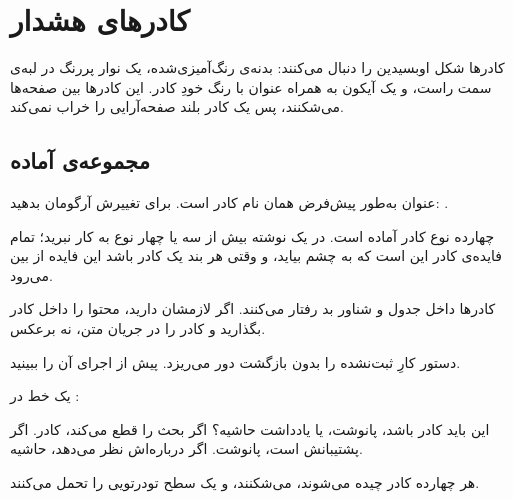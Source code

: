 \chapter{کادرهای هشدار}

کادرها شکل اوبسیدین را دنبال می‌کنند: بدنه‌ی رنگ‌آمیزی‌شده، یک نوار پررنگ در
لبه‌ی سمت راست، و یک آیکون به همراه عنوان با رنگ خودِ کادر. این کادرها بین
صفحه‌ها می‌شکنند، پس یک کادر بلند صفحه‌آرایی را خراب نمی‌کند.

\section{مجموعه‌ی آماده}

\begin{note}
عنوان به‌طور پیش‌فرض همان نام کادر است. برای تغییرش آرگومان بدهید:
.
\end{note}

\begin{tip}
چهارده نوع کادر آماده است. در یک نوشته بیش از سه یا چهار نوع به کار نبرید؛
تمام فایده‌ی کادر این است که به چشم بیاید، و وقتی هر بند یک کادر باشد این
فایده از بین می‌رود.
\end{tip}

\begin{warning}
کادرها داخل جدول و شناور بد رفتار می‌کنند. اگر لازمشان دارید، محتوا را داخل
کادر بگذارید و کادر را در جریان متن، نه برعکس.
\end{warning}

\begin{caution}
دستور  کارِ ثبت‌نشده را بدون بازگشت دور می‌ریزد. پیش از
اجرای آن  را ببینید.
\end{caution}

\begin{example}
یک خط در :

\vspace{4pt}
\end{example}

\begin{question}
این باید کادر باشد، پانوشت، یا یادداشت حاشیه؟ اگر بحث را قطع می‌کند، کادر.
اگر پشتیبانش است، پانوشت. اگر درباره‌اش نظر می‌دهد، حاشیه.
\end{question}

\begin{success}
هر چهارده کادر چیده می‌شوند، می‌شکنند، و یک سطح تودرتویی را تحمل می‌کنند.
\end{success}

